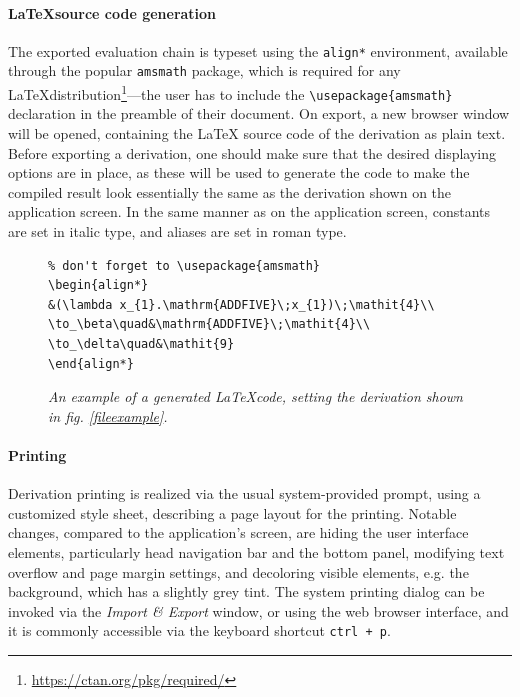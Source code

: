 \documentclass[table, a4paper, 10pt]{book}
\begin{document}
\paragraph{\LaTeX\;source code generation}
The exported evaluation chain is typeset using the \texttt{align*} environment,
available through the popular \texttt{amsmath} package, which is required for
any \LaTeX\;distribution\footnote{\url{https://ctan.org/pkg/required/}}---the
user has to include the \verb|\usepackage{amsmath}| declaration in the 
preamble of their document. On export, a new browser window
will be opened, containing the \LaTeX\; source code of the derivation as plain text.
Before exporting a derivation, one should make sure that the desired
displaying options are in place, as these will be used to generate the code to
make the compiled result look essentially the same as the derivation shown on the application screen.
In the same manner as on the  
application screen, constants are set in italic type, and aliases are set in roman type.

\begin{figure}[H]
\begin{framed}
\begin{verbatim}
% don't forget to \usepackage{amsmath}
\begin{align*}
&(\lambda x_{1}.\mathrm{ADDFIVE}\;x_{1})\;\mathit{4}\\
\to_\beta\quad&\mathrm{ADDFIVE}\;\mathit{4}\\
\to_\delta\quad&\mathit{9}
\end{align*}
\end{verbatim}
\vspace{-0.3cm}
\end{framed}
\vspace{-0.4cm}
\caption{\textit{An example of a generated \LaTeX\;code, setting the derivation shown
in fig. \ref{fileexample}.}}\label{latexexample}
\end{figure}

\paragraph{Printing} Derivation printing is realized via the usual system-provided prompt,
using a customized style sheet, describing a page layout for the printing. Notable changes,
compared to the application's screen, are hiding the user interface elements, particularly
head navigation bar and the bottom panel, modifying text overflow and page margin settings, and
decoloring visible elements, e.g. the background, which has a slightly grey tint.
The system printing dialog can be invoked via the \textit{Import \& Export} window,
or using the web browser interface, and it is commonly accessible via the keyboard shortcut \texttt{ctrl + p}.
\end{document}
